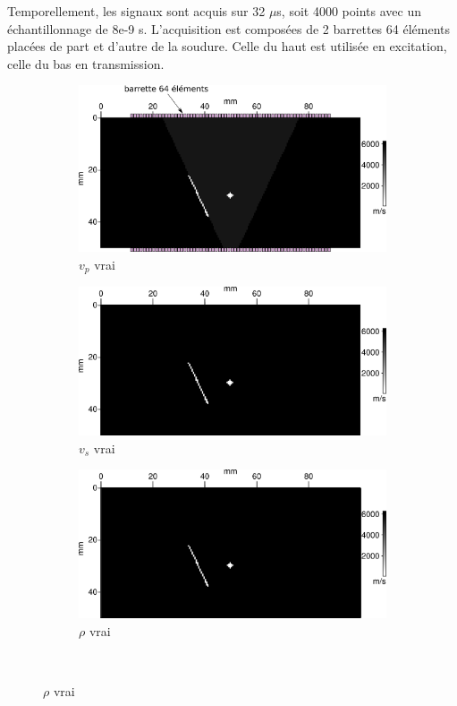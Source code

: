 \documentclass[a4paper,11pt]{report} %
\newenvironment{changemargin}[2]{\begin{list}{}{%
\setlength{\topsep}{0pt}%
\setlength{\leftmargin}{0pt}%
\setlength{\rightmargin}{0pt}%
\setlength{\listparindent}{\parindent}%
\setlength{\itemindent}{\parindent}%
\setlength{\parsep}{0pt plus 1pt}%
\addtolength{\leftmargin}{#1}%
\addtolength{\rightmargin}{#2}%
\setlength{\textwidth}{21cm}
}\item }{\end{list}}
\begin{document}
Temporellement, les signaux sont acquis sur 32 $\mu$s, soit 4000 points avec un échantillonnage de 8e-9 s. L'acquisition est composées de 2 barrettes 64 éléments placées de part et d'autre de la soudure. Celle du haut est utilisée en excitation, celle du bas en transmission.


\begin{figure}[!h]
	\begin{changemargin}{-2cm}{-2cm}
		\begin{subfigure}[b]{0.3\textwidth}
			\includegraphics[width=\textwidth]{img/vp_true_reg.png}
			\caption{$v_{p}$ vrai}
		\end{subfigure}
		\begin{subfigure}[b]{0.3\textwidth}
			\includegraphics[width=\textwidth]{img/vs_true_reg.png}
			\caption{$v_{s}$ vrai}
		\end{subfigure}
		\begin{subfigure}[b]{0.3\textwidth}
			\includegraphics[width=\textwidth]{img/rho_true_reg.png}
			\caption{$\rho$ vrai}
		\end{subfigure}\\
		

\end{changemargin}
\end{figure}
\end{document}
